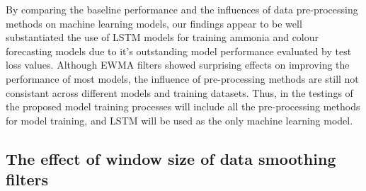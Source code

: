 By comparing the baseline performance and the influences of data pre-processing methods on machine learning models, our findings appear to be well substantiated the use of LSTM models for training ammonia and colour forecasting models due to it's outstanding model performance evaluated by test loss values. Although EWMA filters showed surprising effects on improving the performance of most models, the influence of pre-processing methods are still not consistant across different models and training datasets. Thus, in the testings of the proposed model training processes will include all the pre-processing methods for model training, and LSTM will be used as the only machine learning model.

\subsection{The effect of window size of data smoothing filters}

